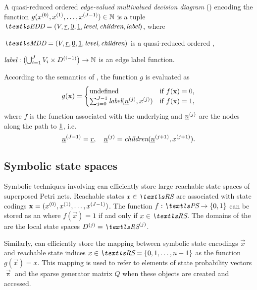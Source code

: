 \begin{dfn}
  A quasi-reduced ordered \emph{edge-valued multivalued decision
    diagram} () \citep{DBLP:conf/nfm/RouxS10} encoding the
  function $g(x^{(0)}, x^{(1)}, \ldots, x^{(J - 1)}) \in \mathbb{N}$
  is a tuple
  $\EDD = (V, \ddnode{r}, \ddnode{0}, \ddnode{1}, \mddLevel,
  \mddChildren, \eddLabel)$, where
  \begin{asparaitem}
  \item $\MDD = (V, \ddnode{r}, \ddnode{0}, \ddnode{1}, \mddLevel,
    \mddChildren)$ is a quasi-reduced ordered ,
  \item $\textit{label}: \bigl( \bigcup_{i = 1}^J V_i \times D^{(i
      - 1)} \bigr) \to \mathbb{N}$ is an edge label function.
  \end{asparaitem}
\end{dfn}

According to the semantics of , the function $g$ is
evaluated as
\begin{equation}
  g(\bm{\mathrm{x}}) = \begin{cases}
    \text{undefined}
    & \text{if $f(\bm{\mathrm{x}}) = 0$,} \\
    \sum_{j = 0}^{J - 1} \textit{label}(\underline{n}^{(j)}, x^{(j)})
    & \text{if $f(\bm{\mathrm{x}}) = 1$,}
  \end{cases}
\end{equation}
where $f$ is the function associated with the underlying 
and $\underline{n}^{(j)}$ are the nodes along the path to
$\underline{1}$, i.e.~
\begin{equation}
  \underline{n}^{(J - 1)} = \underline{r}, \quad \underline{n}^{(j)} =
  \textit{children}(\underline{n}^{(j + 1)}, x^{(j + 1)}) \text.
\end{equation}

\subsection{Symbolic state spaces}

Symbolic techniques involving  can efficiently store
large reachable state spaces of superposed Petri nets. Reachable
states $x \in \RS$ are associated with state codings $\bm{\mathrm{x}} =
(x^{(0)}, x^{(1)}, \ldots, x^{(J - 1)})$. The function $f:
\PS \to \{0, 1\}$ can be stored as an  where $f(\vec{x}) =
1$ if and only if $x \in \RS$. The domains of the  are the
local state spaces $\loc{D}{j} = \loc{\RS}{j}$.

Similarly,  can efficiently store the mapping between
symbolic state encodings $\vec{x}$ and reachable state indices $x \in
\RS = \{0, 1, \ldots, n - 1\}$ as the function $g(\vec{x}) = x$. This
mapping is used to refer to elements of state probability vectors
$\vec{\uppi}$ and the sparse generator matrix $Q$ when these objects
are created and accessed.

